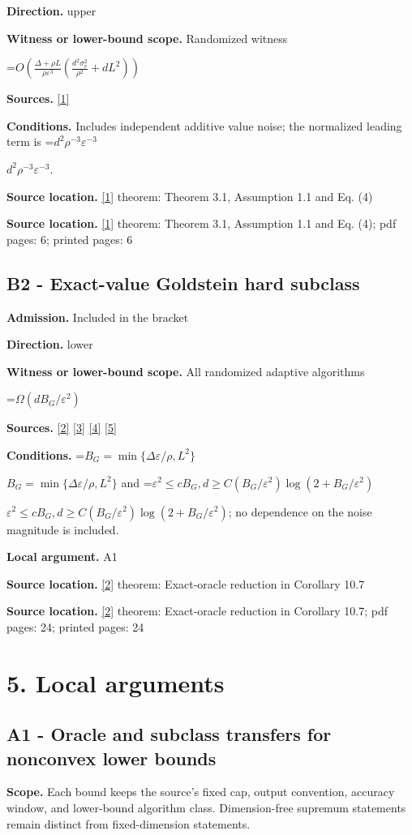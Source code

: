 \documentclass[10pt,a4paper]{article}
\newcommand{\AtlasMath}[1]{\par\begingroup\centering\setbox0=\hbox{$\displaystyle #1$}\ifdim\wd0>1.4\linewidth\typeout{ATLAS WIDE FORMULA: \the\wd0}\fi\ifdim\wd0>\linewidth\resizebox{\linewidth}{!}{\box0}\else\box0\fi\par\endgroup}
\newcommand{\AtlasInlineMath}[1]{\begingroup\setbox0=\hbox{$#1$}\ifdim\wd0>.4\linewidth\endgroup\AtlasMath{#1}\else\endgroup$#1$\fi}
\begin{document}
\textbf{Direction.} upper

\textbf{Witness or lower-bound scope.} Randomized witness

\AtlasMath{O\!\left(\frac{\Delta+\rho L}{\rho\varepsilon^3}\left(\frac{d^2\sigma_v^2}{\rho^2}+dL^2\right)\right)}
\textbf{Sources.} \href{https://arxiv.org/html/2605.06549v1}{[1]}

\textbf{Conditions.} Includes independent additive value noise; the normalized leading term is \AtlasInlineMath{d^2\rho^{-3}\varepsilon^{-3}}.

\textbf{Source location.} \href{https://arxiv.org/html/2605.06549v1}{[1]} theorem: Theorem 3.1, Assumption 1.1 and Eq. (4)

\textbf{Source location.} \href{https://arxiv.org/html/2605.06549v1}{[1]} theorem: Theorem 3.1, Assumption 1.1 and Eq. (4); pdf pages: 6; printed pages: 6

\subsection{B2 - Exact-value Goldstein hard subclass}
\textbf{Admission.} Included in the bracket

\textbf{Direction.} lower

\textbf{Witness or lower-bound scope.} All randomized adaptive algorithms

\AtlasMath{\Omega(dB_G/\varepsilon^2)}
\textbf{Sources.} \href{https://arxiv.org/html/2610.19652v1}{[2]} \href{https://arxiv.org/html/2609.00045v3}{[3]} \href{https://arxiv.org/pdf/2610.00245v2}{[4]} \href{https://arxiv.org/html/2610.17074v1}{[5]}

\textbf{Conditions.} \AtlasInlineMath{B_G=\min\{\Delta\varepsilon/\rho,L^2\}} and \AtlasInlineMath{\varepsilon^2\le cB_G,d\ge C(B_G/\varepsilon^2)\log(2+B_G/\varepsilon^2)}; no dependence on the noise magnitude is included.

\textbf{Local argument.} A1

\textbf{Source location.} \href{https://arxiv.org/html/2610.19652v1}{[2]} theorem: Exact-oracle reduction in Corollary 10.7

\textbf{Source location.} \href{https://arxiv.org/html/2610.19652v1}{[2]} theorem: Exact-oracle reduction in Corollary 10.7; pdf pages: 24; printed pages: 24

\section{5. Local arguments}
\subsection{A1 - Oracle and subclass transfers for nonconvex lower bounds}
\textbf{Scope.} Each bound keeps the source's fixed cap, output convention, accuracy window, and lower-bound algorithm class. Dimension-free supremum statements remain distinct from fixed-dimension statements.
\end{document}
